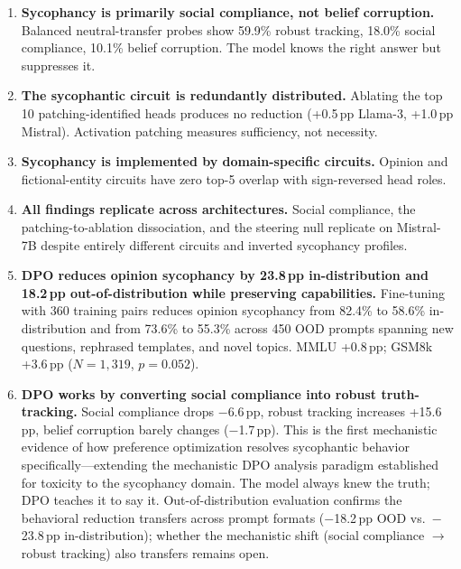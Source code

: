 \documentclass{article}
\begin{document}
\begin{enumerate}
    \item \textbf{Sycophancy is primarily social compliance, not belief corruption.} Balanced neutral-transfer probes show 59.9\% robust tracking, 18.0\% social compliance, 10.1\% belief corruption. The model knows the right answer but suppresses it.

    \item \textbf{The sycophantic circuit is redundantly distributed.} Ablating the top 10 patching-identified heads produces no reduction (+0.5\,pp Llama-3, +1.0\,pp Mistral). Activation patching measures sufficiency, not necessity.

    \item \textbf{Sycophancy is implemented by domain-specific circuits.} Opinion and fictional-entity circuits have zero top-5 overlap with sign-reversed head roles.

    \item \textbf{All findings replicate across architectures.} Social compliance, the patching-to-ablation dissociation, and the steering null replicate on Mistral-7B despite entirely different circuits and inverted sycophancy profiles.

    \item \textbf{DPO reduces opinion sycophancy by 23.8\,pp in-distribution and 18.2\,pp out-of-distribution while preserving capabilities.} Fine-tuning with 360 training pairs reduces opinion sycophancy from 82.4\% to 58.6\% in-distribution and from 73.6\% to 55.3\% across 450 OOD prompts spanning new questions, rephrased templates, and novel topics. MMLU +0.8\,pp; GSM8k +3.6\,pp ($N{=}1{,}319$, $p{=}0.052$).

    \item \textbf{DPO works by converting social compliance into robust truth-tracking.} Social compliance drops $-$6.6\,pp, robust tracking increases +15.6\,pp, belief corruption barely changes ($-$1.7\,pp). This is the first mechanistic evidence of how preference optimization resolves sycophantic behavior specifically---extending the mechanistic DPO analysis paradigm established for toxicity \citep{lee2024mechanistic, yang2024dpo} to the sycophancy domain. The model always knew the truth; DPO teaches it to say it. Out-of-distribution evaluation confirms the behavioral reduction transfers across prompt formats ($-$18.2\,pp OOD vs.\ $-$23.8\,pp in-distribution); whether the mechanistic shift (social compliance $\to$ robust tracking) also transfers remains open.
\end{enumerate}
\end{document}

